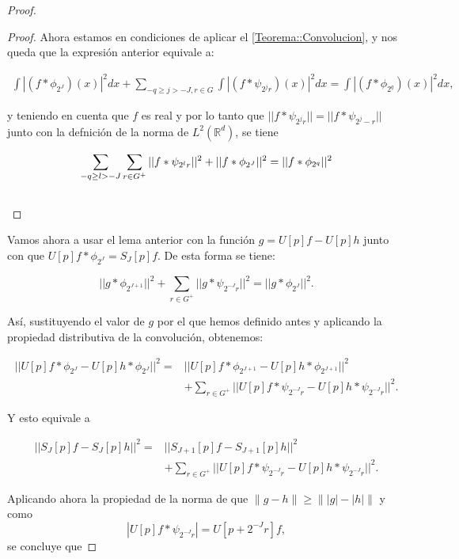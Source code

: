 \begin{proof}
\begin{proof}
  \noindent Ahora estamos en condiciones de aplicar el \autoref{Teorema::Convolucion}, y nos queda que la expresión anterior equivale a: 

  \begin{align*}
    \int \left|(f \ast \phi_{2^J}) (x)\right|^2 dx + \sum_{-q \geq j >-J,r \in G} \int \left|(f \ast \psi_{2^{j}r})(x)\right|^2 dx=\int \left|(f \ast \phi_{2^q}) (x)\right|^2 dx,
  \end{align*}

  \noindent y teniendo en cuenta que $f$ es real y por lo tanto que $||f \ast \psi_{2^j r}||= ||f \ast \psi_{2^j -r}||$ junto con la defnición de la norma de $L^2(\mathbb{R}^d)$, se tiene  

  \begin{align*}
    \sum_{-q\geq l > -J} \sum_{r \in G^+} || f \ast \psi_{2^lr}||^2 + || f \ast \phi_{2^J}||^2 = || f \ast \phi_{2^q} ||^2& \\ 
    &\qedhere
  \end{align*} 

\end{proof}


\noindent Vamos ahora a usar el lema anterior con la función $g=U[p]f-U[p]h$ junto con que $U[p]f\ast \phi_{2^J}=S_J[p]f$. De esta forma se tiene:

$$||g \ast \phi_{2^{J+1}} ||^2 + \sum_{r\in G^+} || g\ast \psi_{2^{-J}r} ||^2=||g \ast \phi_{2^J}||^2.$$

\noindent Así, sustituyendo el valor de $g$ por el que hemos definido antes y aplicando la propiedad distributiva de la convolución, obtenemos:

\begin{align*}
  ||U[p]f \ast \phi_{2^J} -U[p]h \ast \phi_{2^J}||^2 = &||U[p]f \ast \phi_{2^{J+1}} - U[p]h \ast \phi_{2^{J+1}} ||^2 \\
  & + \sum_{r\in G^+} || U[p]f\ast \psi_{2^{-J}r} -U[p]h \ast \psi_{2^{-J}r}||^2.
\end{align*}

\noindent Y esto equivale a

\begin{align*}
  ||S_{J}[p]f-S_J[p]h||^2 = &|| S_{J+1}[p]f-S_{J+1}[p]h||^2 \\
  & + \sum_{r\in G^+} || U[p]f\ast \psi_{2^{-J}r} -U[p]h \ast \psi_{2^{-J}r}||^2.
\end{align*}

\noindent Aplicando ahora la propiedad de la norma de que $\|g - h \| \geq \| |g| - |h| \|$ y como $$|U[p]f\ast\psi_{2^{-J}r}|=U[p+2^{-J}r]f,$$ se concluye que


\end{proof}
